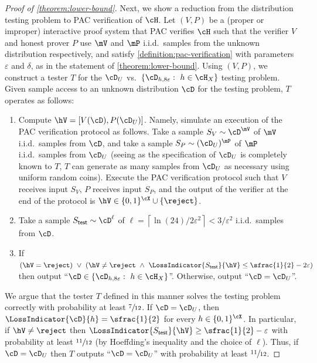 \begin{proof}[Proof of \cref{theorem:lower-bound}]
	Next, we show a reduction from the distribution testing problem to PAC verification of $\cH$. Let $(V,P)$ be a (proper or improper) interactive proof system that PAC verifies $\cH$ such that the verifier $V$ and honest prover $P$ use $\mV$ and $\mP$ i.i.d.\ samples from the unknown distribution respectively, and satisfy \cref{definition:pac-verification} with parameters $\varepsilon$ and $\delta$, as in the statement of \cref{theorem:lower-bound}.
	Using $(V,P)$, we construct a tester $T$ for the $\cD_U$ vs.\ $\{\cD_{h,8\varepsilon}: ~ h \in \cH_X\}$ testing problem. Given sample access to an unknown distribution $\cD$ for the testing problem, $T$ operates as follows:
	\begin{enumerate}
		\item{
			Compute $\hV = [V(\cD),P(\cD_U)]$. Namely, simulate an execution of the PAC verification protocol as follows. Take a sample $S_V \sim \cD^{\mV}$ of $\mV$ i.i.d.\ samples from $\cD$, and take a sample $S_P \sim (\cD_U)^{\mP}$ of $\mP$ i.i.d.\ samples from $\cD_U$ (seeing as the specification of $\cD_U$ is completely known to $T$, $T$ can generate as many samples from $\cD_U$ as necessary using uniform random coins). Execute the PAC verification protocol such that $V$ receives input $S_V$, $P$ receives input $S_P$, and the output of the verifier at the end of the protocol is $\hV \in \{0,1\}^\cX \cup \{\reject\}$.   
		}
		\item{
			Take a sample $S_{\mathsf{test}} \sim \cD^\ell$ of $\ell = \left\lceil \ln(24)/2\varepsilon^2 \right\rceil < 3/\varepsilon^2$ i.i.d.\ samples from $\cD$.
		}
		\item{
			If $(\hV = \reject)  ~ \lor ~ (\hV \neq \reject ~ \land ~ \LossIndicator{S_{\mathsf{test}}}{\hV} \leq \sfrac{1}{2}-2\varepsilon)$ then output ``$\cD \in \{\cD_{h,8\varepsilon} : ~ h \in \cH_X\}$''. Otherwise, output ``$\cD = \cD_U$''. 
		}
	\end{enumerate}
	We argue that the tester $T$ defined in this manner solves the testing problem correctly with probability at least $\sfrac{7}{12}$. If $\cD = \cD_U$, then $\LossIndicator{\cD}{h} = \sfrac{1}{2}$ for every $h \in \{0,1\}^\cX$. In particular, if $\hV \neq \reject$ then $\LossIndicator{S_{\mathsf{test}}}{\hV} \geq \sfrac{1}{2} - \varepsilon$ with probability at least $\sfrac{11}{12}$ (by Hoeffding's inequality and the choice of $\ell$). Thus, if $\cD = \cD_U$ then $T$ outputs ``$\cD = \cD_U$'' with probability at least $\sfrac{11}{12}$. 
	

\end{proof}
